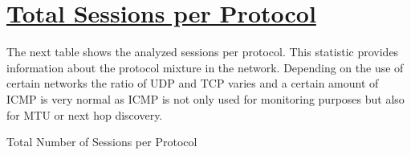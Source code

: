 %
%
%

\chapter[Total Sessions per Protocol]{\underline{Total Sessions per Protocol}}
\begin{flushleft}
The next table shows the analyzed sessions per protocol. This statistic provides information about the protocol mixture in the network. Depending on the use of certain networks the ratio of UDP and TCP varies and a certain amount of ICMP is very normal as ICMP is not only used for monitoring purposes but also for MTU or next hop discovery.
\end{flushleft}

\begin{table}[H]
  \begin{center}
    \caption[\normalsize{Total Number of Sessions per Protocol}]{\small{Total Number of Sessions per Protocol}}
  \end{center}
\end{table}


